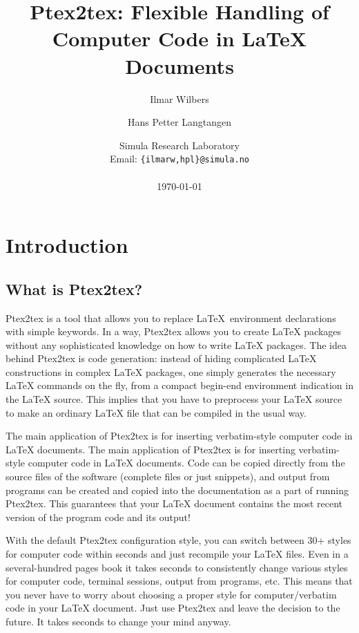 \documentclass[a4paper,11pt]{article}
\begin{document}
\title{Ptex2tex: Flexible Handling of Computer Code in \LaTeX{} Documents}
\author{Ilmar Wilbers \and Hans Petter Langtangen}

\date{Simula Research Laboratory\\
Email: \texttt{\{ilmarw,hpl\}@simula.no}\\
\ \ \\
\today}
\maketitle

\section{Introduction}
\subsection{What is Ptex2tex?}
Ptex2tex is a tool that allows you to replace \LaTeX~environment declarations
with simple keywords. In a way, Ptex2tex allows you to create \LaTeX{}
packages without any sophisticated knowledge on how to write
\LaTeX{} packages. The idea behind Ptex2tex is code generation: instead
of hiding complicated \LaTeX{} constructions in complex \LaTeX{}
packages, one simply generates the necessary \LaTeX{} commands on the
fly, from a compact begin-end environment indication in the \LaTeX{}
source.
This implies that you have to preprocess your \LaTeX{} source
to make an ordinary {\LaTeX} file that can be compiled in the usual way.

The main application of Ptex2tex is for inserting verbatim-style
computer code in \LaTeX{} documents.  The main application of Ptex2tex
is for inserting verbatim-style computer code in \LaTeX{}
documents. Code can be copied directly from the source files of the
software (complete files or just snippets), and output from programs
can be created and copied into the documentation as a part of running
Ptex2tex.  This guarantees that your {\LaTeX} document contains the most
recent version of the program code and its output!


With the default Ptex2tex configuration style, you can switch between
30+ styles for computer code within seconds and just recompile your
\LaTeX{} files.  Even in a several-hundred pages book it takes seconds
to consistently change various styles for computer code, terminal
sessions, output from programs, etc. This means that you never have to
worry about choosing a proper style for computer/verbatim code in your
\LaTeX{} document.  Just use Ptex2tex and leave the decision to the
future. It takes seconds to change your mind anyway.
\end{document}
